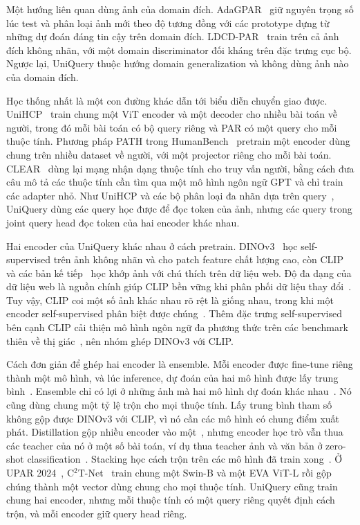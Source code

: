 \documentclass[10pt,twocolumn,letterpaper]{article}
\begin{document}
Một hướng liên quan dùng ảnh của domain đích. AdaGPAR~\cite{adagpar} giữ nguyên trọng số lúc test và phân loại ảnh mới theo độ tương đồng với các prototype dựng từ những dự đoán đáng tin cậy trên domain đích. LDCD-PAR~\cite{ldcd} train trên cả ảnh đích không nhãn, với một domain discriminator đối kháng trên đặc trưng cục bộ. Ngược lại, UniQuery thuộc hướng domain generalization và không dùng ảnh nào của domain đích.

Học thống nhất là một con đường khác dẫn tới biểu diễn chuyển giao được. UniHCP~\cite{unihcp} train chung một ViT encoder và một decoder cho nhiều bài toán về người, trong đó mỗi bài toán có bộ query riêng và PAR có một query cho mỗi thuộc tính. Phương pháp PATH trong HumanBench~\cite{humanbench} pretrain một encoder dùng chung trên nhiều dataset về người, với một projector riêng cho mỗi bài toán. CLEAR~\cite{clear} dùng lại mạng nhận dạng thuộc tính cho truy vấn người, bằng cách đưa câu mô tả các thuộc tính cần tìm qua một mô hình ngôn ngữ GPT và chỉ train các adapter nhỏ. Như UniHCP và các bộ phân loại đa nhãn dựa trên query~\cite{q2l,mldecoder}, UniQuery dùng các query học được để đọc token của ảnh, nhưng các query trong joint query head đọc token của hai encoder khác nhau.

Hai encoder của UniQuery khác nhau ở cách pretrain. DINOv3~\cite{dinov3} học self-supervised trên ảnh không nhãn và cho patch feature chất lượng cao, còn CLIP~\cite{clip} và các bản kế tiếp~\cite{metaclip,dfn,evaclip,siglip2,pe} học khớp ảnh với chú thích trên dữ liệu web. Độ đa dạng của dữ liệu web là nguồn chính giúp CLIP bền vững khi phân phối dữ liệu thay đổi~\cite{clipdata}. Tuy vậy, CLIP coi một số ảnh khác nhau rõ rệt là giống nhau, trong khi một encoder self-supervised phân biệt được chúng~\cite{eyeswide}. Thêm đặc trưng self-supervised bên cạnh CLIP cải thiện mô hình ngôn ngữ đa phương thức trên các benchmark thiên về thị giác~\cite{eyeswide,cambrian}, nên nhóm ghép DINOv3 với CLIP.

Cách đơn giản để ghép hai encoder là ensemble. Mỗi encoder được fine-tune riêng thành một mô hình, và lúc inference, dự đoán của hai mô hình được lấy trung bình~\cite{deepens}. Ensemble chỉ có lợi ở những ảnh mà hai mô hình dự đoán khác nhau~\cite{krogh}. Nó cũng dùng chung một tỷ lệ trộn cho mọi thuộc tính. Lấy trung bình tham số~\cite{soups,wiseft} không gộp được DINOv3 với CLIP, vì nó cần các mô hình có chung điểm xuất phát. Distillation gộp nhiều encoder vào một~\cite{amradio}, nhưng encoder học trò vẫn thua các teacher của nó ở một số bài toán, ví dụ thua teacher ảnh và văn bản ở zero-shot classification~\cite{amradio,cradio4}. Stacking học cách trộn trên các mô hình đã train xong~\cite{stacking}. Ở UPAR 2024~\cite{upar24}, C$^2$T-Net~\cite{c2tnet} train chung một Swin-B và một EVA ViT-L rồi gộp chúng thành một vector dùng chung cho mọi thuộc tính. UniQuery cũng train chung hai encoder, nhưng mỗi thuộc tính có một query riêng quyết định cách trộn, và mỗi encoder giữ query head riêng.
\end{document}
